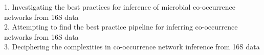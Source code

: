 
\begin{titlepage}

  \newcommand{\HRule}{\rule{\linewidth}{0.5mm}} %

  \center %





  \vspace*{\fill}
  { \huge  1. Investigating the best practices for inference of microbial co-occurrence networks from 16S data}\\[0.4cm] %
  { \huge  2. Attempting to find the best practice pipeline for inferring co-occurrence networks from 16S data}\\[0.4cm] %
  { \huge  3. Deciphering the complexities in co-occurrence network inference from 16S data}\\[0.4cm] %






  \vspace*{\fill} %

\end{titlepage}


\newpage
